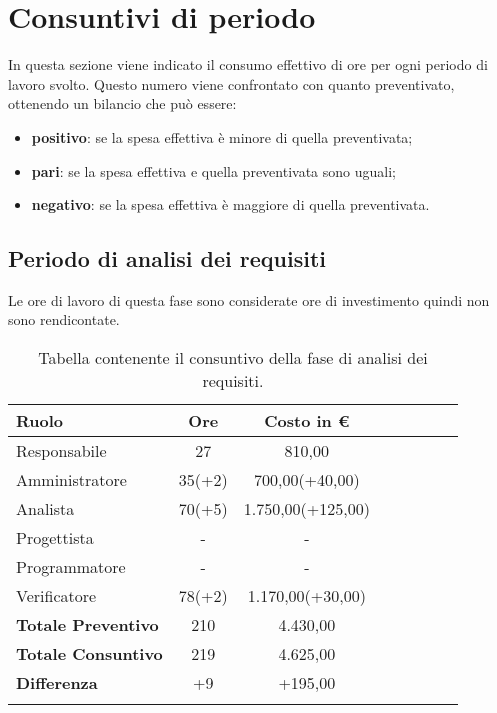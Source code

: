 \section{Consuntivi di periodo}
In questa sezione viene indicato il consumo effettivo di ore per ogni periodo di lavoro svolto. Questo numero viene confrontato con quanto preventivato, ottenendo un bilancio che può essere:
\begin{itemize}
    \item \textbf{positivo}: se la spesa effettiva è minore di quella preventivata;
    \item \textbf{pari}: se la spesa effettiva e quella preventivata sono uguali;
    \item \textbf{negativo}:  se la spesa effettiva è maggiore di quella preventivata.
\end{itemize}

\subsection{Periodo di analisi dei requisiti}
Le ore di lavoro di questa fase sono considerate ore di investimento quindi non sono rendicontate.
            				
			\begin{longtable}{|l|c|c|c|c|c|c|c|}
				\hline
				\rowcolor{lighter-grayer}
				\textbf{Ruolo} & \textbf{Ore} & \textbf{Costo in €} \\
				\hline
				\endfirsthead
				
				\hline
				Responsabile & 27 & 810,00\\
				\hline
				\hline
				Amministratore & 35(+2) & 700,00(+40,00)\\
				\hline
				\hline
				Analista & 70(+5) & 1.750,00(+125,00)\\
				\hline
				\hline
				Progettista & - & -\\
				\hline
				\hline
				Programmatore & - & -\\
				\hline
				\hline
				Verificatore & 78(+2) & 1.170,00(+30,00)\\
				\hline
                \textbf{Totale Preventivo} & 210 & 4.430,00\\
                \hline
				\hline
                \textbf{Totale Consuntivo} & 219 & 4.625,00\\
                \hline
                \hline
                \textbf{Differenza} & +9 & +195,00\\
				\hline
				\caption{Tabella contenente il consuntivo della fase di analisi dei requisiti.}
			\end{longtable}
